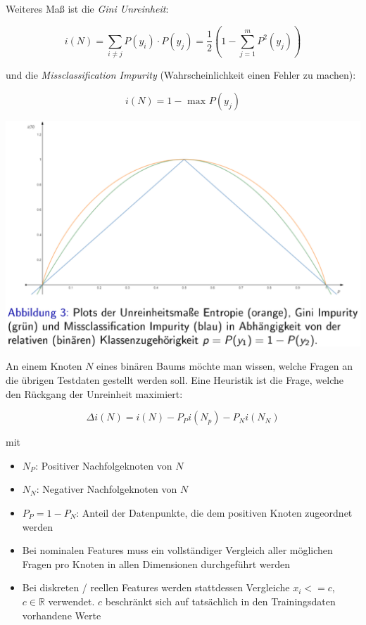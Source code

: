 \documentclass{report}
\begin{document}
  Weiteres Maß ist die \textit{Gini Unreinheit}:	
  
  $$i(N) = \sum_{i\neq j}P(y_i)\cdot P(y_j) = \frac{1}{2}(1 - \sum_{j=1}^mP^2(y_j))$$	
  
  und die \textit{Missclassification Impurity} (Wahrscheinlichkeit einen Fehler zu machen):	
  
  $$i(N) = 1 - \text{ max }P(y_j)$$	
  
  \begin{center}	
    \includegraphics[scale=.3]{ml07_6}	
  \end{center}	
  
  An einem Knoten $N$ eines binären Baums möchte man wissen, welche Fragen an die übrigen Testdaten gestellt werden soll.	
  Eine Heuristik ist die Frage, welche den Rückgang der Unreinheit maximiert:	
  
  $$\Delta i(N) = i(N) - P_Pi(N_p) - P_Ni(N_N)$$	
  
  mit\\	
  \vspace*{-1.5em}	
  \begin{itemize}	
    \item $N_P$: Positiver Nachfolgeknoten von $N$	
    \item $N_N$: Negativer Nachfolgeknoten von $N$	
    \item $P_P = 1 - P_N$: Anteil der Datenpunkte, die dem positiven Knoten zugeordnet werden	
    \item Bei nominalen Features muss ein vollständiger Vergleich aller möglichen Fragen pro Knoten in allen	
    Dimensionen durchgeführt werden	
    \item Bei diskreten / reellen Features werden stattdessen Vergleiche $x_i <= c$, $c\in \mathbb{R}$ verwendet.	
    $c$ beschränkt sich auf tatsächlich in den Trainingsdaten vorhandene Werte	
  \end{itemize}	
  
\end{document}
